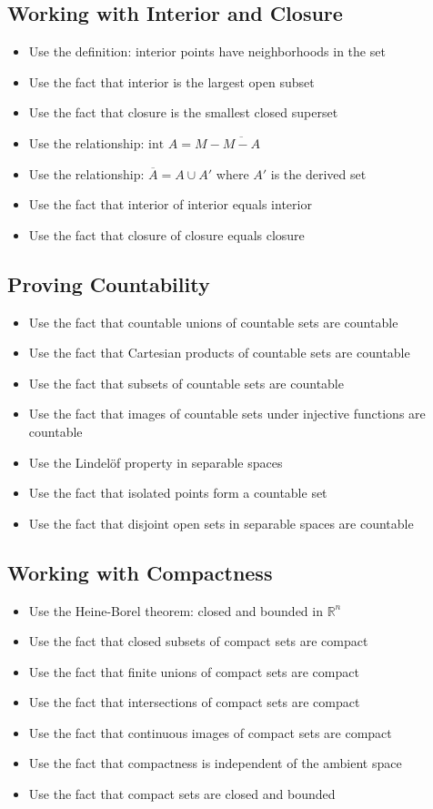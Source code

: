 \subsection*{Working with Interior and Closure}
\begin{itemize}
\item Use the definition: interior points have neighborhoods in the set
\item Use the fact that interior is the largest open subset
\item Use the fact that closure is the smallest closed superset
\item Use the relationship: $\text{int } A = M - \overline{M - A}$
\item Use the relationship: $\overline{A} = A \cup A'$ where $A'$ is the derived set
\item Use the fact that interior of interior equals interior
\item Use the fact that closure of closure equals closure
\end{itemize}

\subsection*{Proving Countability}
\begin{itemize}
\item Use the fact that countable unions of countable sets are countable
\item Use the fact that Cartesian products of countable sets are countable
\item Use the fact that subsets of countable sets are countable
\item Use the fact that images of countable sets under injective functions are countable
\item Use the Lindelöf property in separable spaces
\item Use the fact that isolated points form a countable set
\item Use the fact that disjoint open sets in separable spaces are countable
\end{itemize}

\subsection*{Working with Compactness}
\begin{itemize}
\item Use the Heine-Borel theorem: closed and bounded in $\mathbb{R}^n$
\item Use the fact that closed subsets of compact sets are compact
\item Use the fact that finite unions of compact sets are compact
\item Use the fact that intersections of compact sets are compact
\item Use the fact that continuous images of compact sets are compact
\item Use the fact that compactness is independent of the ambient space
\item Use the fact that compact sets are closed and bounded
\end{itemize}

